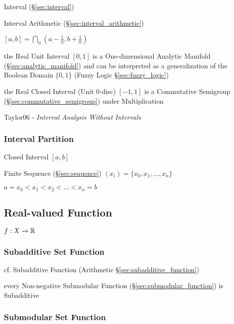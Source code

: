 Interval (\S\ref{sec:interval})

Interval Arithmetic (\S\ref{sec:interval_arithmetic})

$[a,b] = \bigcap_n (a - \frac{1}{n}, b + \frac{1}{n})$

the Real Unit Interval $[0,1]$ is a One-dimensional Analytic Manifold
(\S\ref{sec:analytic_manifold}) and can be interpreted as a generalization of
the Boolean Domain $\{0, 1\}$ (Fuzzy Logic \S\ref{sec:fuzzy_logic})

the Real Closed Interval (Unit 0-disc) $[-1,1]$ is a Commutative Semigroup
(\S\ref{sec:commutative_semigroup}) under Multiplication

Taylor06 - \emph{Interval Analysis Without Intervals}



\subsubsection{Interval Partition}\label{sec:interval_partition}

Closed Interval $[a,b]$

Finite Sequence (\S\ref{sec:sequence}) $(x_i) = \{ x_0, x_1, \ldots,
x_n \}$

$a = x_0 < x_1 < x_2 < \ldots < x_n = b$



\subsection{Real-valued Function}\label{sec:real_valued}

$f : X \rightarrow \mathbb{R}$



\subsubsection{Subadditive Set Function}\label{sec:subadditive_set_function}

cf. Subadditive Function (Arithmetic \S\ref{sec:subadditive_function})

every Non-negative Submodular Function (\S\ref{sec:submodular_function}) is
Subadditive



\subsubsection{Submodular Set Function}\label{sec:submodular_set_function}

